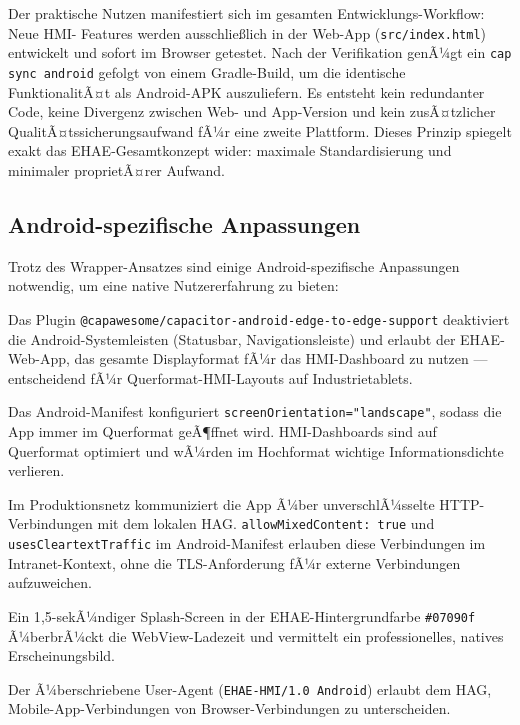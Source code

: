 ﻿\documentclass[12pt,a4paper]{article}
\begin{document}
Der praktische Nutzen manifestiert sich im gesamten Entwicklungs-Workflow: Neue HMI-%
Features werden ausschlie\ss{}lich in der Web-App (\texttt{src/index.html}) entwickelt
und sofort im Browser getestet. Nach der Verifikation genÃ¼gt ein \texttt{cap sync
android} gefolgt von einem Gradle-Build, um die identische FunktionalitÃ¤t als
Android-APK auszuliefern. Es entsteht kein redundanter Code, keine Divergenz zwischen
Web- und App-Version und kein zusÃ¤tzlicher QualitÃ¤tssicherungsaufwand fÃ¼r eine zweite
Plattform. Dieses Prinzip spiegelt exakt das EHAE-Gesamtkonzept wider: maximale
Standardisierung und minimaler proprietÃ¤rer Aufwand.

\subsection{Android-spezifische Anpassungen}

Trotz des Wrapper-Ansatzes sind einige Android-spezifische Anpassungen notwendig, um
eine native Nutzererfahrung zu bieten:

\begin{description}[leftmargin=2em]
  \item[Edge-to-Edge-Darstellung] Das Plugin
    \texttt{@capawesome/capacitor-android-edge-to\newline -edge-support} deaktiviert die
    Android-Systemleisten (Statusbar, Navigationsleiste) und erlaubt der EHAE-Web-App,
    das gesamte Displayformat fÃ¼r das HMI-Dashboard zu nutzen --- entscheidend fÃ¼r
    Querformat-HMI-Layouts auf Industrietablets.
  \item[Querformat-Fixierung] Das Android-Manifest konfiguriert
    \texttt{screenOrientation="{}land\newline scape"{}}, sodass die App immer im Querformat
    geÃ¶ffnet wird. HMI-Dashboards sind auf Querformat optimiert und wÃ¼rden im
    Hochformat wichtige Informationsdichte verlieren.
  \item[Intranet-Verbindungen] Im Produktionsnetz kommuniziert die App Ã¼ber
    unverschlÃ¼sselte HTTP-Verbindungen mit dem lokalen HAG.
    \texttt{allowMixedContent: true} und \texttt{usesCleartextTraffic} im
    Android-Manifest erlauben diese Verbindungen im Intranet-Kontext, ohne die
    TLS-Anforderung fÃ¼r externe Verbindungen aufzuweichen.
  \item[Splash-Screen] Ein 1{,}5-sekÃ¼ndiger Splash-Screen in der EHAE-Hintergrundfarbe
    \texttt{\#07090f} Ã¼berbrÃ¼ckt die WebView-Ladezeit und vermittelt ein
    professionelles, natives Erscheinungsbild.
  \item[User-Agent-Identifikation] Der Ã¼berschriebene User-Agent
    (\texttt{EHAE-HMI/1.0 Android}) erlaubt dem HAG, Mobile-App-Verbindungen
    von Browser-Verbindungen zu unterscheiden.
\end{description}
\end{document}

